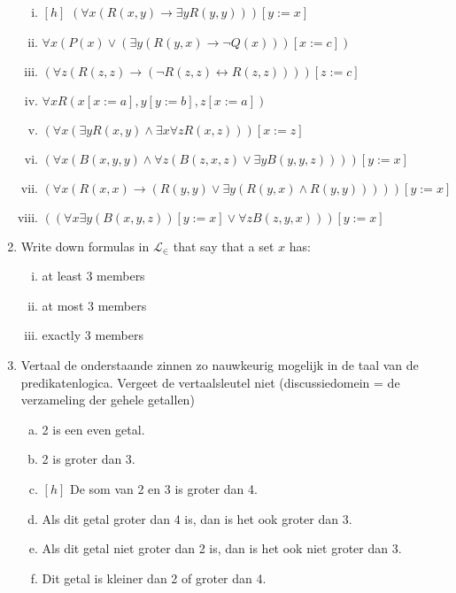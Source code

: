 \begin{enumerate}[\thesection.1]
\begin{enumerate}[(i)]
			\item $[h]$ $(\forall x(R(x,y)\to\exists yR(y,y)))[y:=x]$


			\item $\forall x(P(x)\lor (\exists y(R(y,x)\to \neg Q(x)))[x:=c])$

			\item $(\forall z(R(z,z)\to (\neg R(z,z)\leftrightarrow R(z,z))))[z:=c]$

			\item  $\forall x R(x[x:=a], y[y:=b], z[x:=a])$
			
			\item  $(\forall x(\exists yR(x,y)\land \exists x\forall zR(x,z)))[x:=z]$


			\item  $(\forall x(B(x,y,y)\land \forall z(B(z,x,z)\lor \exists yB(y,y,z))))[y:=x]$


			\item  $(\forall x(R(x,x)\to (R(y,y)\lor \exists y(R(y,x)\land R(y,y)))))[y:=x]$


			\item $((\forall x\exists y(B(x,y,z))[y:=x]\lor \forall zB(z,y,x)))[y:=x]$

		\end{enumerate}
		
		\item Write down formulas in $\mathcal{L}_\in$ that say that a set $x$ has:
		
		\begin{enumerate}[(i)]
		
			\item at least 3 members
			
			\item at most 3 members
			
			\item exactly 3 members
		
		\end{enumerate}
		
		\item 
 Vertaal de onderstaande zinnen zo nauwkeurig mogelijk in de taal
van de predikatenlogica. Vergeet de vertaalsleutel niet
(discussiedomein = de verzameling der gehele getallen)
\begin{enumerate}[a.]
\item 
2 is een even getal.
\item
2 is groter dan 3.
\item $[h]$ 
De som van 2 en 3 is groter dan 4.
\item
Als dit getal groter dan 4 is, dan is het ook groter dan 3.
\item
Als dit getal niet groter dan 2 is, dan is het ook niet groter dan 3.
\item
Dit getal is kleiner dan 2 of groter dan 4.
 \end{enumerate}


\end{enumerate}
